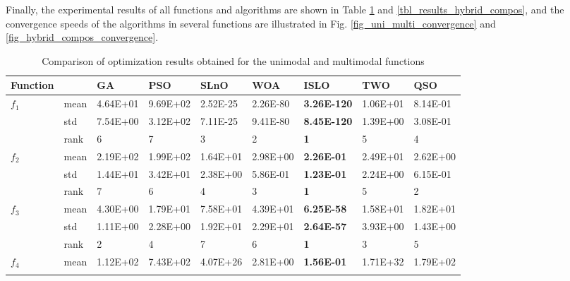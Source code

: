 \documentclass[a4paper,13pt,2p]{report}
\begin{document}
	Finally, the experimental results of all functions and algorithms are shown in Table \ref{tbl_results_uni_multi} and \ref{tbl_results_hybrid_compos}, and the convergence speeds of the algorithms in several functions are illustrated in Fig. \ref{fig_uni_multi_convergence} and \ref{fig_hybrid_compos_convergence}.

\begin{table}[!t]
\caption{Comparison of optimization results obtained for the unimodal and multimodal functions}
\label{tbl_results_uni_multi}
\begin{tabular}{|l|l|l|l|l|l|l|l|l|}
\hline
Function             &      & GA       & PSO      & SLnO     & WOA               & ISLO               & TWO      & QSO               \\ \hline
\multirow{3}{*}{$f_1$}  & mean & 4.64E+01 & 9.69E+02 & 2.52E-25 & 2.26E-80          & \textbf{3.26E-120} & 1.06E+01 & 8.14E-01          \\ \cline{2-9} 
                     & std  & 7.54E+00 & 3.12E+02 & 7.11E-25 & 9.41E-80          & \textbf{8.45E-120} & 1.39E+00 & 3.08E-01          \\ \cline{2-9} 
                     & rank & 6        & 7        & 3        & 2                 & \textbf{1}         & 5        & 4                 \\ \hline
\multirow{3}{*}{$f_2$}  & mean & 2.19E+02 & 1.99E+02 & 1.64E+01 & 2.98E+00          & \textbf{2.26E-01}  & 2.49E+01 & 2.62E+00          \\ \cline{2-9} 
                     & std  & 1.44E+01 & 3.42E+01 & 2.38E+00 & 5.86E-01          & \textbf{1.23E-01}  & 2.24E+00 & 6.15E-01          \\ \cline{2-9} 
                     & rank & 7        & 6        & 4        & 3                 & \textbf{1}         & 5        & 2                 \\ \hline
\multirow{3}{*}{$f_3$}  & mean & 4.30E+00 & 1.79E+01 & 7.58E+01 & 4.39E+01          & \textbf{6.25E-58}  & 1.58E+01 & 1.82E+01          \\ \cline{2-9} 
                     & std  & 1.11E+00 & 2.28E+00 & 1.92E+01 & 2.29E+01          & \textbf{2.64E-57}  & 3.93E+00 & 1.43E+00          \\ \cline{2-9} 
                     & rank & 2        & 4        & 7        & 6                 & \textbf{1}         & 3        & 5                 \\ \hline
\multirow{3}{*}{$f_4$}  & mean & 1.12E+02 & 7.43E+02 & 4.07E+26 & 2.81E+00          & \textbf{1.56E-01}  & 1.71E+32 & 1.79E+02          \\ \cline{2-9} 

\end{tabular}
\end{table}
\end{document}
